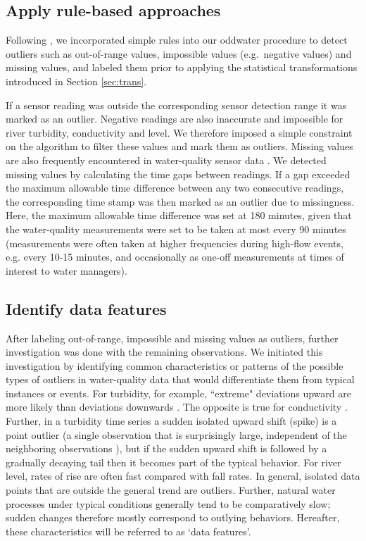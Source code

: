 \documentclass[draft]{agujournal2018} %
\begin{document}
\subsection{Apply rule-based
approaches}\label{apply-rule-based-approaches}

 \color{black} Following \citet{thottan2003anomaly}, we incorporated simple rules
into our oddwater procedure to detect outliers such as
out-of-range values, impossible values (e.g.~negative values) and
missing values, and labeled them prior to applying the
statistical transformations introduced in Section \ref{sec:trans}. \color{black}

If a sensor reading was outside the corresponding sensor detection range
it was marked as an outlier. Negative readings are also inaccurate and
impossible for river turbidity, conductivity and level. We therefore
imposed a simple constraint on the algorithm to filter these values and
mark them as outliers. Missing values are also frequently encountered in
water-quality sensor data \citep{rangeti2015validity}. We detected
missing values by calculating the time gaps between readings. If a gap
exceeded the maximum allowable time difference between any two
consecutive readings, the corresponding time stamp was then marked as an
outlier due to missingness. \color{black} Here, the maximum allowable time difference was set at 180 minutes, given that the water-quality measurements were set to be taken at most every 90 minutes (measurements were often taken at higher frequencies during high-flow events, e.g. every 10-15 minutes, and occasionally as one-off measurements at times of interest to water managers). \color{black}

\subsection{Identify data features}\label{identify-data-features}

\color{black} After labeling out-of-range, impossible and missing values as outliers, further investigation was done with the remaining observations. We initiated this investigation by identifying  common characteristics or patterns of the possible types of outliers in water-quality data that would differentiate them from typical instances or events. \color{black} For turbidity, for example, ``extreme" deviations upward are more likely than deviations downwards
\citep{panguluri2009distribution}. The opposite is true for
conductivity \citep{tutmez2006modelling}. Further, in a turbidity
time series a sudden isolated upward shift (spike) is a point outlier (a
single observation that is surprisingly large, independent of
the neighboring observations \citep{goldstein2016comparative}), but
if the sudden upward shift is followed by a gradually decaying tail then
it becomes part of the typical behavior. For river level, rates of rise
are often fast compared with fall rates. In general, isolated data
points that are outside the general trend are outliers. Further, natural
water processes under typical conditions generally tend to be
comparatively slow; sudden changes therefore mostly correspond to
outlying behaviors. Hereafter, these characteristics will be referred to as
`data features'.
\end{document}
